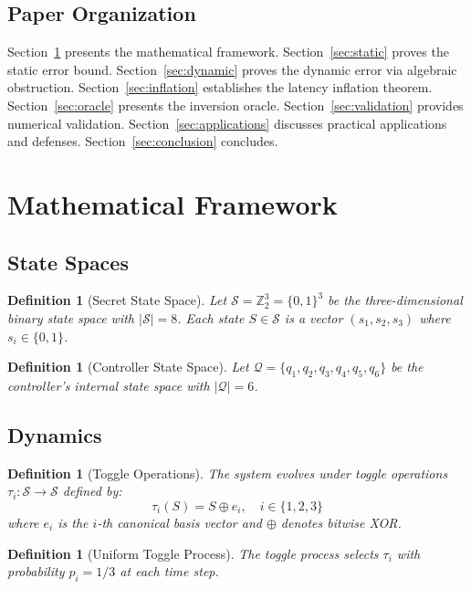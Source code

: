 \documentclass[11pt]{article}
\newtheorem{definition}[theorem]{Definition}
\begin{document}
\subsection{Paper Organization}

Section~\ref{sec:framework} presents the mathematical framework. Section~\ref{sec:static} proves the static error bound. Section~\ref{sec:dynamic} proves the dynamic error via algebraic obstruction. Section~\ref{sec:inflation} establishes the latency inflation theorem. Section~\ref{sec:oracle} presents the inversion oracle. Section~\ref{sec:validation} provides numerical validation. Section~\ref{sec:applications} discusses practical applications and defenses. Section~\ref{sec:conclusion} concludes.

\section{Mathematical Framework}
\label{sec:framework}

\subsection{State Spaces}

\begin{definition}[Secret State Space]
Let $\mathcal{S} = \mathbb{Z}_2^3 = \{0,1\}^3$ be the three-dimensional binary state space with $|\mathcal{S}| = 8$. Each state $S \in \mathcal{S}$ is a vector $(s_1, s_2, s_3)$ where $s_i \in \{0,1\}$.
\end{definition}

\begin{definition}[Controller State Space]
Let $\mathcal{Q} = \{q_1, q_2, q_3, q_4, q_5, q_6\}$ be the controller's internal state space with $|\mathcal{Q}| = 6$.
\end{definition}

\subsection{Dynamics}

\begin{definition}[Toggle Operations]
The system evolves under toggle operations $\tau_i: \mathcal{S} \to \mathcal{S}$ defined by:
$$\tau_i(S) = S \oplus e_i, \quad i \in \{1, 2, 3\}$$
where $e_i$ is the $i$-th canonical basis vector and $\oplus$ denotes bitwise XOR.
\end{definition}

\begin{definition}[Uniform Toggle Process]
The toggle process selects $\tau_i$ with probability $p_i = 1/3$ at each time step.
\end{definition}
\end{document}
